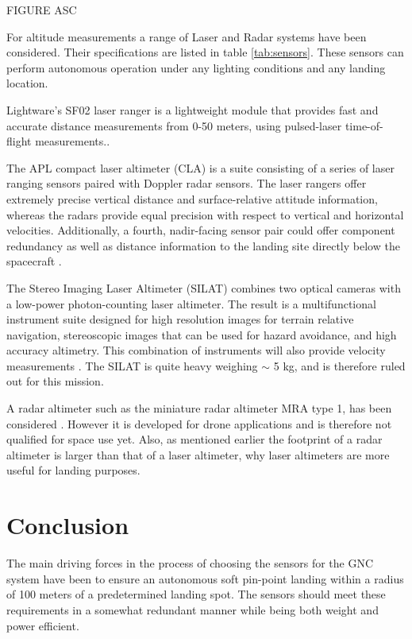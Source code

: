 FIGURE ASC



For altitude measurements a range of Laser and Radar systems have been considered. Their specifications are listed in table \ref{tab:sensors}. These sensors can perform autonomous operation under any lighting conditions and any landing location.

Lightware’s SF02 laser ranger is a lightweight module that provides fast and accurate distance measurements from 0-50 meters, using pulsed-laser time-of-flight measurements.\cite{https://www.parallax.com/product/28043}. 

The APL compact laser altimeter (CLA) is a suite consisting of a series of laser ranging sensors paired with  Doppler radar sensors. The laser rangers offer extremely precise vertical distance and surface-relative attitude information, whereas the radars provide equal precision with respect to vertical and horizontal velocities. Additionally, a fourth, nadir-facing sensor pair could offer component redundancy as well as distance information to the landing site directly below the spacecraft \cite{http://www.jhuapl.edu/techdigest/TD/td3004/30_4-Bruzzi.pdf}. 


The Stereo Imaging Laser Altimeter (SILAT) combines two optical cameras with a low-power photon-counting laser altimeter. The result is a multifunctional instrument suite designed for high resolution images for terrain relative navigation, stereoscopic images that can be used for hazard avoidance, and high accuracy altimetry. This combination of instruments will also provide velocity measurements \citep{SILAT}. The SILAT is quite heavy weighing $\sim$ 5 kg, and is therefore ruled out for this mission.

A radar altimeter such as the miniature radar altimeter MRA type 1, has been considered \cite{http://www.miniradalt.com/mra-type-1.html}. However it is developed for drone applications and is therefore not qualified for space use yet. Also, as mentioned earlier the footprint of a radar altimeter is larger than that of a laser altimeter, why laser altimeters are more useful for landing purposes.  



\section{Conclusion}

The main driving forces in the process of choosing the sensors for the GNC system have been to ensure an autonomous soft pin-point landing within a radius of 100 meters of a predetermined landing spot. The sensors should meet these requirements in a somewhat redundant manner while being both weight and power efficient. 

